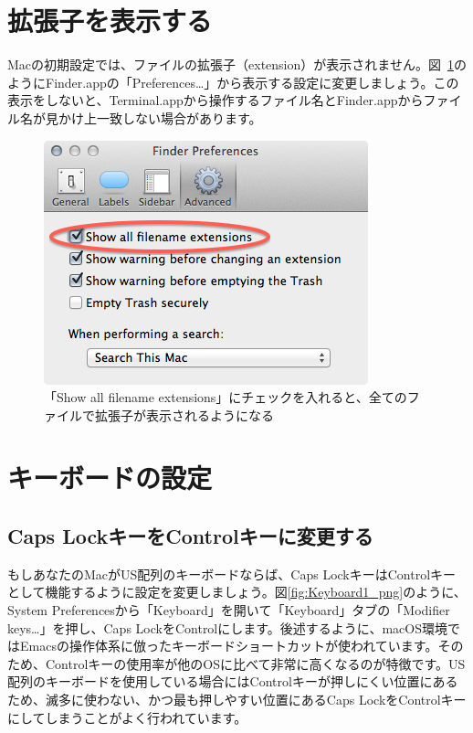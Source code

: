 \section{拡張子を表示する}
Macの初期設定では、ファイルの拡張子（extension）が表示されません。図~\ref{fig:Extension_png}のようにFinder.appの「Preferences\ldots」から表示する設定に変更しましょう。この表示をしないと、Terminal.appから操作するファイル名とFinder.appからファイル名が見かけ上一致しない場合があります。

\begin{figure}
  \centering
  \includegraphics[scale=0.35]{fig/Extension.png}
  \caption{「Show all filename extensions」にチェックを入れると、全てのファイルで拡張子が表示されるようになる}
  \label{fig:Extension_png}
\end{figure}

\section{キーボードの設定}

\subsection{Caps LockキーをControlキーに変更する}
もしあなたのMacがUS配列のキーボードならば、Caps LockキーはControlキーとして機能するように設定を変更しましょう。図\ref{fig:Keyboard1_png}のように、System Preferencesから「Keyboard」を開いて「Keyboard」タブの「Modifier keys\ldots」を押し、Caps LockをControlにします。後述するように、macOS環境ではEmacsの操作体系に倣ったキーボードショートカットが使われています。そのため、Controlキーの使用率が他のOSに比べて非常に高くなるのが特徴です。US配列のキーボードを使用している場合にはControlキーが押しにくい位置にあるため、滅多に使わない、かつ最も押しやすい位置にあるCaps LockをControlキーにしてしまうことがよく行われています。

